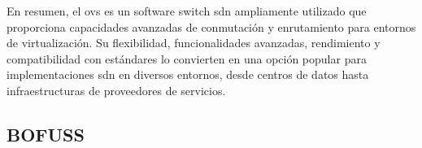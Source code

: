 En resumen, el \gls{ovs} es un software switch \gls{sdn} ampliamente utilizado que proporciona capacidades avanzadas de conmutación y enrutamiento para entornos de virtualización. Su flexibilidad, funcionalidades avanzadas, rendimiento y compatibilidad con estándares lo convierten en una opción popular para implementaciones \gls{sdn} en diversos entornos, desde centros de datos hasta infraestructuras de proveedores de servicios.


\subsection{BOFUSS}
\label{subsec:BOFUSS}
